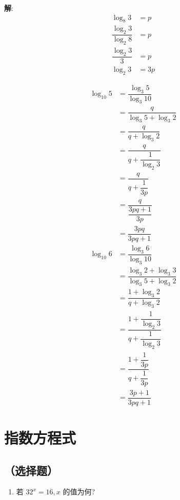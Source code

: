 \documentclass{report}
\newcommand{\sol}{\vspace{0.2cm}\textbf{解}:}
\begin{document}
\begin{multicols*}{2}
\begin{enumerate}[leftmargin=*]
              \sol{}
              \begin{align*}
                  \log_8 3                   & = p  \\
                  \dfrac{\log_2 3}{\log_2 8} & = p  \\
                  \dfrac{\log_2 3}{3}        & = p  \\
                  \log_2 3                   & = 3p
              \end{align*}

              \begin{align*}
                  \log_{10} 5 & = \dfrac{\log_3 5}{\log_3 10}        \\
                              & = \dfrac{q}{\log_3 5 + \log_3 2}     \\
                              & = \dfrac{q}{q + \log_3 2}            \\
                              & = \dfrac{q}{q + \dfrac{1}{\log_2 3}} \\
                              & = \dfrac{q}{q + \dfrac{1}{3p}}       \\
                              & = \dfrac{q}{\dfrac{3pq + 1}{3p}}     \\
                              & = \dfrac{3pq}{3pq + 1}
              \end{align*}
              \begin{align*}
                  \log_{10} 6 & = \dfrac{\log_3 6}{\log_3 10}                              \\
                              & = \dfrac{\log_3 2 + \log_3 3}{\log_3 5 + \log_3 2}         \\
                              & = \dfrac{1 + \log_3 2}{q + \log_3 2}                       \\
                              & = \dfrac{1 + \dfrac{1}{\log_2 3}}{q + \dfrac{1}{\log_2 3}} \\
                              & = \dfrac{1 + \dfrac{1}{3p}}{q + \dfrac{1}{3p}}             \\
                              & = \dfrac{3p + 1}{3pq + 1}
              \end{align*}
    \end{enumerate}

    \section{指数方程式}

    \subsection*{（选择题）}
    \begin{enumerate}
        \item 若 $32^x=16, x$ 的值为何?


\end{enumerate}
\end{multicols*}
\end{document}
